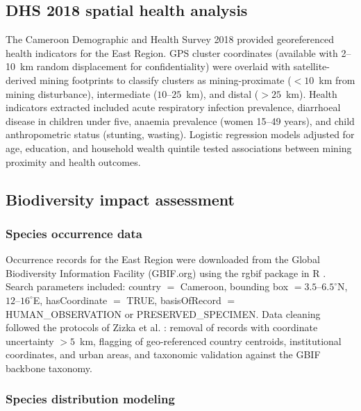 \documentclass[preprint,12pt,number]{elsarticle}
\begin{document}
\subsection{DHS 2018 spatial health analysis}

The Cameroon Demographic and Health Survey 2018 \cite{INS2019} provided georeferenced health indicators for the East Region. GPS cluster coordinates (available with 2--10~km random displacement for confidentiality) were overlaid with satellite-derived mining footprints to classify clusters as mining-proximate ($< 10$~km from mining disturbance), intermediate ($10$--$25$~km), and distal ($> 25$~km). Health indicators extracted included acute respiratory infection prevalence, diarrhoeal disease in children under five, anaemia prevalence (women 15--49 years), and child anthropometric status (stunting, wasting). Logistic regression models adjusted for age, education, and household wealth quintile tested associations between mining proximity and health outcomes.


\subsection{Biodiversity impact assessment}

\subsubsection{Species occurrence data}

Occurrence records for the East Region were downloaded from the Global Biodiversity Information Facility (GBIF.org) using the rgbif package in R \cite{Chamberlain2024}. Search parameters included: country $=$ Cameroon, bounding box $= 3.5$--$6.5^{\circ}$N, $12$--$16^{\circ}$E, hasCoordinate $=$ TRUE, basisOfRecord $=$ HUMAN\_OBSERVATION or PRESERVED\_SPECIMEN. Data cleaning followed the protocols of Zizka et al. \cite{Zizka2019}: removal of records with coordinate uncertainty $> 5$~km, flagging of geo-referenced country centroids, institutional coordinates, and urban areas, and taxonomic validation against the GBIF backbone taxonomy.

\subsubsection{Species distribution modeling}
\end{document}
